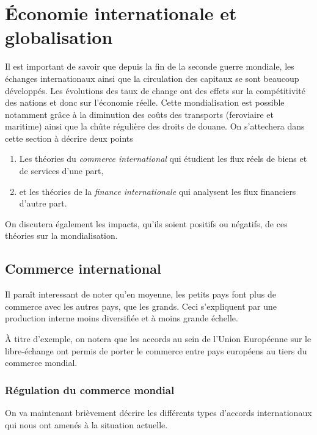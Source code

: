 \section{Économie internationale et globalisation} %
\label{sec:economie_internationale_et_globalisation}

Il est important de savoir que depuis la fin de la seconde guerre mondiale,
les échanges internationaux ainsi que la circulation des capitaux se
sont beaucoup développés.
Les évolutions des taux de change ont des effets sur la compétitivité
des nations et donc sur l'économie réelle.
Cette mondialisation est possible notamment grâce à la diminution
des coûts des transports (feroviaire et maritime)
ainsi que la chûte régulière des droits de douane.
On s'attechera dans cette section à décrire deux points
\begin{enumerate}
  \item Les théories du \emph{commerce international} qui étudient les flux réels de biens 
  et de services d'une part,
  \item et les théories de la \emph{finance internationale} qui analysent les flux 
  financiers d'autre part.
\end{enumerate}
On discutera également les impacts, qu'ils soient positifs ou négatifs,
de ces théories sur la mondialisation.

\subsection{Commerce international} %
\label{sub:commerce_international}
Il paraît interessant de noter qu'en moyenne, les petits pays font plus 
de commerce avec les autres pays, que les grands.
Ceci s'expliquent par une production interne moins diversifiée
et à moins grande échelle.

À titre d'exemple, on notera que les accords au sein de l'Union Européenne
sur le libre-échange ont permis de porter le commerce entre pays européens au tiers
du commerce mondial.


\subsubsection{Régulation du commerce mondial} %
\label{ssub:regulation_du_commerce_mondial}
On va maintenant brièvement décrire les différents types d'accords internationaux
qui nous ont amenés à la situation actuelle.

